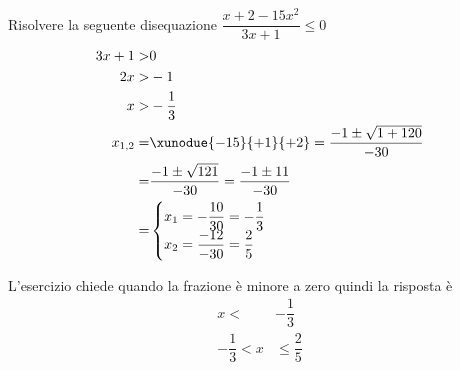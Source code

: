 	Risolvere la seguente disequazione $\dfrac{x+2-15x^2}{3x+1}\leq0$
	\begin{align*}
	3x+1>&0\\
	2x>&-1\\
	x>&-\dfrac{1}{3}\\
	x_{1,2}=&\xunodue{-15}{+1}{+2}=\dfrac{-1\pm\sqrt{1+120}}{-30}\\
	=&\dfrac{-1\pm\sqrt{121}}{-30}=\dfrac{-1\pm 11}{-30}\\
	=&\begin{cases}
	x_1=-\dfrac{10}{30}=-\dfrac{1}{3}\\
	x_2=\dfrac{-12}{-30}=\dfrac{2}{5}
	\end{cases}\\
	\end{align*}
	\begin{center}
		
	\end{center}
	L'esercizio chiede quando la frazione è minore a zero quindi la risposta è
	\begin{align*}
	x<&-\dfrac{1}{3}\\
	-\dfrac{1}{3}<x&\leq \dfrac{2}{5}\\
	\end{align*}
